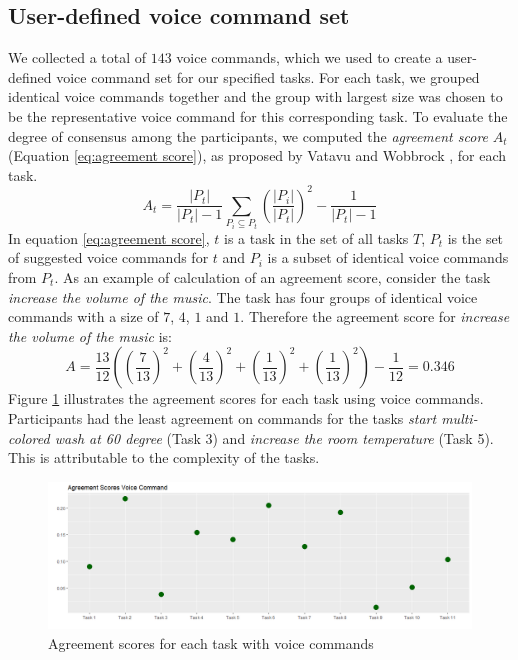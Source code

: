 \documentclass[sigchi]{acmart}
\begin{document}
	\subsection{User-defined voice command set}
We collected a total of $143$ voice commands, which we used to create a user-defined voice command set for our specified tasks. For each task, we grouped identical voice commands together and the group with largest size was chosen to be the representative voice command for this corresponding task. To evaluate the degree of consensus among the participants, we computed the \textit{agreement score} $A_t$ (Equation \ref{eq:agreement score}), as proposed by Vatavu and Wobbrock \cite{Vatavu.2015}, for each task.
		\begin{equation}
			\label{eq:agreement score}
			A_t = \frac{|P_t|}{|P_t|-1} \sum_{P_i \subseteq P_t} \left(\frac{|P_i|}{|P_t|}\right)^2  - \frac{1}{|P_t|-1}
		\end{equation}
In equation \ref{eq:agreement score}, $t$ is a task in the set of all tasks $T$, $P_t$ is the set of suggested voice commands for $t$ and $P_i$ is a subset of identical voice commands from $P_t$. 
As an example of calculation of an agreement score, consider the task \textit{increase the volume of the music}. The task has four groups of identical voice commands with a size of $7$, $4$, $1$ and $1$. Therefore the agreement score for \textit{increase the volume of the music} is:
		\begin{equation}
			A = \frac{13}{12} \left(\left(\frac{7}{13}\right)^2 + \left(\frac{4}{13}\right)^2 + \left(\frac{1}{13}\right)^2 + \left(\frac{1}{13}\right)^2 \right)- \frac{1}{12} = 0.346
		\end{equation}
		Figure \ref{figure:ASvoice} illustrates the agreement scores for each task using voice commands. Participants had the least agreement on commands for the tasks \textit{start multi-colored wash at 60 degree} (Task 3) and \textit{increase the room temperature} (Task 5). This is attributable to the complexity of the tasks.
		\begin{figure}
			\label{figure:ASvoice}			
			\centering
			\includegraphics[width=\textwidth]{AgreementVoice}
			\caption{Agreement scores for each task with voice commands}
		\end{figure}
\end{document}
